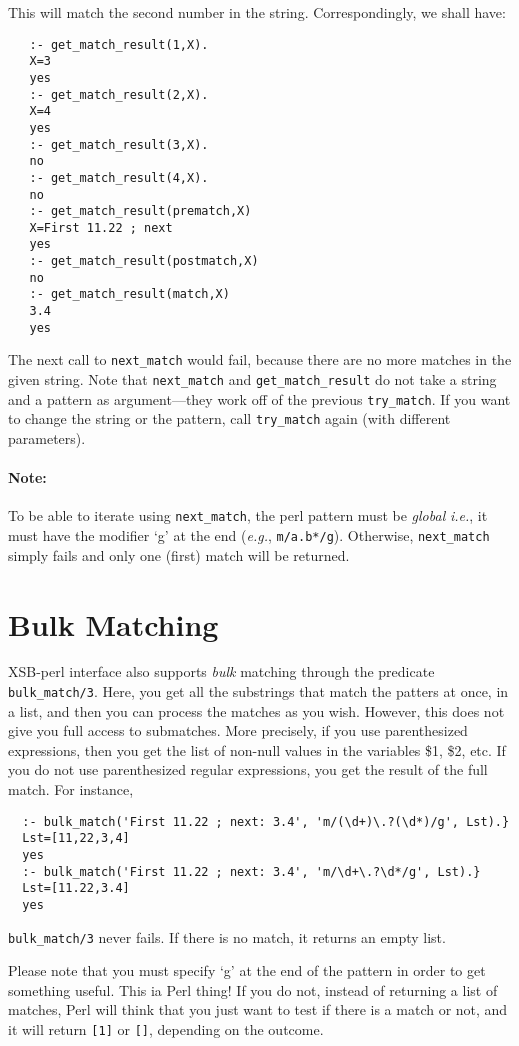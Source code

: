 This will match the second number in the string. Correspondingly, we shall
have: 
\begin{verbatim}
   :- get_match_result(1,X).
   X=3
   yes
   :- get_match_result(2,X).
   X=4
   yes
   :- get_match_result(3,X).
   no
   :- get_match_result(4,X).
   no
   :- get_match_result(prematch,X)
   X=First 11.22 ; next 
   yes
   :- get_match_result(postmatch,X)
   no
   :- get_match_result(match,X)
   3.4
   yes
\end{verbatim}

The next call to {\tt next\_match}  would fail, because there are no more
matches in the given string. Note that {\tt next\_match} and
{\tt get\_match\_result} do not take a string and a pattern as
argument---they work off of the previous {\tt try\_match}. If you want to
change the string or the pattern, call {\tt try\_match} again (with
different parameters).

\paragraph{Note:} To be able to iterate using {\tt next\_match}, the perl
pattern must be \emph{global} {\it i.e.}, it must have the modifier `g' at
the end ({\it e.g.}, {\tt m/a.b*/g}). Otherwise, {\tt next\_match} simply
fails and only one (first) match will be returned.  

\section{Bulk Matching}
XSB-perl interface also supports {\em bulk\/} matching through the
predicate {\tt bulk\_match/3}. Here, you get all
the substrings that match the patters at once, in a list, and then you can
process the matches as you wish. However, this does not give you full
access to submatches. More precisely, if you use parenthesized expressions,
then you get the list of non-null values in the variables \$1, \$2, etc.
If you do not use parenthesized regular expressions, you get the result of
the full match. For instance,
\begin{verbatim}
  :- bulk_match('First 11.22 ; next: 3.4', 'm/(\d+)\.?(\d*)/g', Lst).}
  Lst=[11,22,3,4]
  yes
  :- bulk_match('First 11.22 ; next: 3.4', 'm/\d+\.?\d*/g', Lst).}
  Lst=[11.22,3.4]
  yes
\end{verbatim}
{\tt bulk\_match/3} never fails. If there is no match, it returns an empty
list. 

Please note that you must specify `g' at the end of the pattern in order to
get something useful. This ia Perl thing! If you do not, instead of
returning a list of matches, Perl will think that you just want to test if
there is a match or not, and it will return \verb|[1]| or \verb|[]|,
depending on the outcome.


